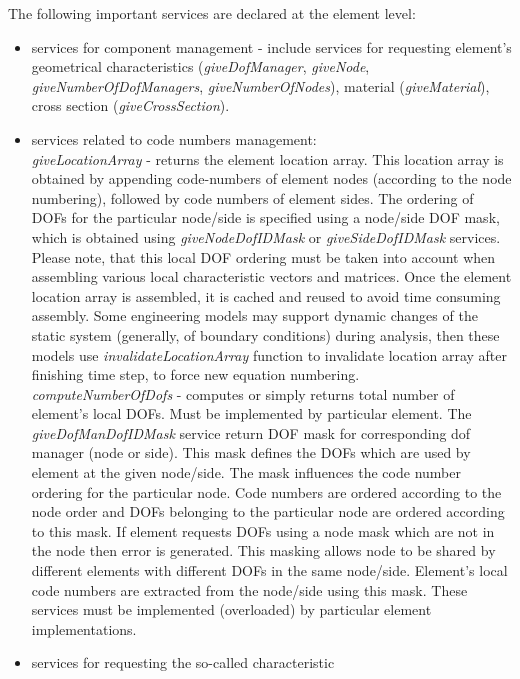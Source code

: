 \documentclass[12pt,draft]{article}
\newcommand{\service}[1]{{\em #1}}
\begin{document}
The following important services are declared at the element level:
\begin{itemize}
\item services for component management - include services for
requesting element's geometrical characteristics
(\service{giveDofManager}, \service{giveNode},
\service{giveNumberOfDofManagers},
\service{giveNumberOfNodes}), material (\service{giveMaterial}), cross
section (\service{giveCrossSection}).

\item services related to code numbers management:\\
\service{giveLocationArray} - returns the element location array. This
location array is obtained by appending  code-numbers of element
nodes (according to the node numbering), followed by code numbers of
element sides. The ordering of DOFs for the particular node/side is
specified using a node/side DOF mask, which is obtained using
\service{giveNodeDofIDMask} or \service{giveSideDofIDMask} services.
Please note, that this local DOF ordering must be taken into account when assembling various local characteristic 
  vectors and matrices. Once the element location array is assembled,
it is cached and reused to avoid time consuming assembly. 
 Some engineering models
  may support dynamic changes of the static system (generally, of boundary conditions) during analysis,
  then these models use \service{invalidateLocationArray} function to invalidate location array
after finishing time step, to force new equation numbering.\\
\service{computeNumberOfDofs} - computes or simply returns total
number of element's local DOFs. Must be implemented by particular
element. The \service{giveDofManDofIDMask} service return
DOF mask for corresponding dof manager (node or side). This mask defines the DOFs which are used by element 
at the given node/side. The mask influences the code number ordering
for the particular node. Code numbers are 
ordered according to the node order and DOFs belonging to the particular node are ordered 
according to this mask. If element requests DOFs using a node mask
which are not in the node
then error is generated. This masking allows node to be shared by different elements with 
different DOFs in the same node/side. Element's local code numbers are
extracted from the node/side using 
this mask. These services must be implemented (overloaded) by
particular element implementations.
\item
services for requesting the so-called  characteristic

\end{itemize}
\end{document}
